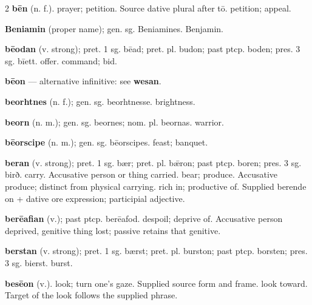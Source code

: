 \begin{multicols*}{2}
\textbf{bēn} (n. f.). prayer; petition. Source dative plural after tō. petition; appeal.\par
\textbf{Beniamin} (proper name); gen. sg. Beniamines. Benjamin.\par
\textbf{bēodan} (v. strong); pret. 1 sg. bēad; pret. pl. budon; past ptcp. boden; pres. 3 sg. bīett. offer. command; bid.\par
\textbf{bēon} — alternative infinitive: see \textbf{wesan}.\par
\textbf{beorhtnes} (n. f.); gen. sg. beorhtnesse. brightness.\par
\textbf{beorn} (n. m.); gen. sg. beornes; nom. pl. beornas. warrior.\par
\textbf{bēorscipe} (n. m.); gen. sg. bēorscipes. feast; banquet.\par
\textbf{beran} (v. strong); pret. 1 sg. bær; pret. pl. bǣron; past ptcp. boren; pres. 3 sg. birð. carry. Accusative person or thing carried. bear; produce. Accusative produce; distinct from physical carrying. rich in; productive of. Supplied berende on + dative ore expression; participial adjective.\par
\textbf{berēafian} (v.); past ptcp. berēafod. despoil; deprive of. Accusative person deprived, genitive thing lost; passive retains that genitive.\par
\textbf{berstan} (v. strong); pret. 1 sg. bærst; pret. pl. burston; past ptcp. borsten; pres. 3 sg. bierst. burst.\par
\textbf{besēon} (v.). look; turn one's gaze. Supplied source form and frame. look toward. Target of the look follows the supplied phrase.\par

\end{multicols*}
